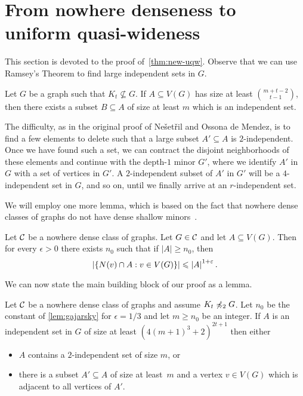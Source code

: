 \section{From nowhere denseness to uniform quasi-wideness}\label{sec:uqw}

This section is devoted to the proof of~\cref{thm:new-uqw}. 
Observe that we can use Ramsey's Theorem to find large independent
sets in $G$. 

\begin{lemma}\label{lem:ramsey1}
Let $G$ be a graph such that $K_t\not\subseteq G$. If $A\subseteq V(G)$
has size at least $\binom{m+t-2}{t-1}$, then there exists
a subset $B\subseteq A$ of size at least $m$ which is an
independent set. 
\end{lemma}

The difficulty, as in the 
original proof of Ne\v{s}et\v{r}il and Ossona de Mendez, 
is to find a few elements to delete such that a large
subset $A'\subseteq A$ is $2$-independent. Once we have 
found such a set, we can 
contract the disjoint neighborhoods of these elements and
continue with the depth-$1$ minor $G'$, where we 
identify $A'$ in $G$ with a set of vertices in $G'$. A $2$-independent
subset of $A'$ in $G'$ will be a $4$-independent set in $G$, 
and so on, until we finally arrive at an $r$-independent set. 

We will employ one more lemma, which is based on the fact that
nowhere dense classes of graphs do not have dense 
shallow minors~\cite{dvorak2007asymptotical,jiang2011compact}. 

\begin{lemma}\label{lem:diversity}\label{lem:gajarsky}
Let $\mathcal{C}$ be a nowhere dense class of graphs. Let $G\in \mathcal{C}$ and let $A\subseteq V(G)$. 
Then for every $\epsilon>0$ there exists $n_0$ such that if $|A|\geq n_0$, then 
\[\left\lvert\{N(v)\cap A : v\in V(G)\}\right\rvert\leqslant\left\lvert A\right\rvert^{1+\varepsilon}.\]
\end{lemma}

We can now state the main building block of our proof as a lemma. 

\begin{lemma}\label{lem:apex}
Let $\mathcal{C}$ be a nowhere dense class of graphs and assume $K_t\not\preccurlyeq_2 G$. 
Let $n_0$ be the constant of \cref{lem:gajarsky} for $\epsilon=1/3$ 
and let $m\geq n_0$ be an integer. 
If $A$ is an independent set in $G$ of size at least $(4(m+1)^3+2)^{2t+1}$ 
then either 
\begin{itemize}
\item $A$ contains a $2$-independent set of size $m$, or
\item there is a subset $A'\subseteq A$ of size at least~$m$ and
a vertex $v\in V(G)$ which is adjacent to all vertices of $A'$. 
\end{itemize}
\end{lemma}


